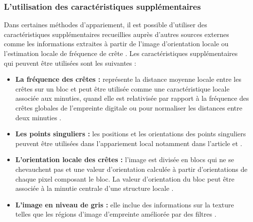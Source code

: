 \subsubsection{L'utilisation des caractéristiques supplémentaires}
Dans certaines méthodes d'appariement, il est possible d'utiliser des caractéristiques supplémentaires recueillies auprès d'autres sources externes comme les informations extraites à partir de l'image d'orientation locale ou l'estimation locale de fréquence de crête \citep{Peralta2015a}. Les caractéristiques supplémentaires qui peuvent être utilisées sont les suivantes :
\begin{itemize}
	\item \textbf{La fréquence des crêtes : }représente la distance moyenne locale entre les crêtes sur un bloc et peut être utilisée comme une caractéristique locale associée aux minuties, quand elle est relativisée par rapport à la fréquence des crêtes globales de l'empreinte digitale ou pour normaliser les distances entre deux minuties \citep{chikkerur2007fingerprint}.
	\item \textbf{Les points singuliers :} les positions et les orientations des points singuliers peuvent être utilisées dans l'appariement local notamment dans l'article \citep{zhang2002core} et \citep{feng2008combining}.
	\item \textbf{L'orientation locale des crêtes :} l'image est divisée en blocs qui ne se chevauchent pas et une valeur d'orientation calculée à partir d'orientations de chaque pixel composant le bloc. La valeur d'orientation du bloc  peut être associée à la minutie centrale d'une structure locale \citep{maltoni2009handbook}. 
	\item \textbf{L'image en niveau de gris :} elle inclue des informations sur la texture telles que les régions d'image d'empreinte améliorée par des filtres \citep{Peralta2015a}.
\end{itemize}
